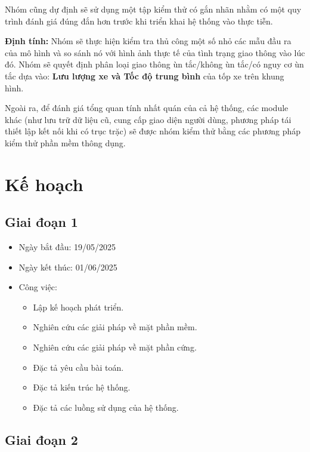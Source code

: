 \quad Nhóm cũng dự định sẽ sử dụng một tập kiểm thử có gắn nhãn nhằm có một quy trình đánh giá đúng đắn hơn trước khi triển khai hệ thống vào thực tiễn.

\quad \textbf{Định tính:} Nhóm sẽ thực hiện kiểm tra thủ công một số nhỏ các mẫu đầu ra của mô hình và so sánh nó với hình ảnh thực tế của tình trạng giao thông vào lúc đó. Nhóm sẽ quyết định phân loại giao thông ùn tắc/không ùn tắc/có nguy cơ ùn tắc dựa vào: \textbf{Lưu lượng xe và Tốc độ trung bình} của tốp xe trên khung hình.

\quad Ngoài ra, để đánh giá tổng quan tính nhất quán của cả hệ thống, các module khác (như lưu trữ dữ liệu cũ, cung cấp giao diện người dùng, phương pháp tái thiết lập kết nối khi có trục trặc) sẽ được nhóm kiểm thử bằng các phương pháp kiểm thử phần mềm thông dụng.

\section{Kế hoạch}
\subsection{Giai đoạn 1}
\begin{itemize}
    \item Ngày bắt đầu: 19/05/2025
    \item Ngày kết thúc: 01/06/2025
    \item Công việc:
    \begin{itemize}
        \item Lập kế hoạch phát triển.
        \item Nghiên cứu các giải pháp về mặt phần mềm.
        \item Nghiên cứu các giải pháp về mặt phần cứng.
        \item Đặc tả yêu cầu bài toán.
        \item Đặc tả kiến trúc hệ thống.
        \item Đặc tả các luồng sử dụng của hệ thống.
    \end{itemize}
\end{itemize}

\subsection{Giai đoạn 2}

